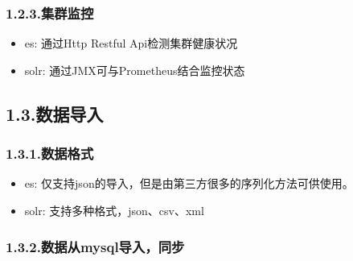\documentclass{article}
\begin{document}
\subsubsection{1.2.3.\hspace*{0.5em}集群监控}\label{section}%

\begin{itemize}[noitemsep,topsep=\mdcompacttopsep]%

\item{}es: 通过Http Restful Api检测集群健康状况%

\item{}solr: 通过JMX可与Prometheus结合监控状态%
\end{itemize}%

\subsection{1.3.\hspace*{0.5em}数据导入}\label{section}%

\subsubsection{1.3.1.\hspace*{0.5em}数据格式}\label{section}%

\begin{itemize}[noitemsep,topsep=\mdcompacttopsep]%

\item{}es: 仅支持json的导入，但是由第三方很多的序列化方法可供使用。%

\item{}solr: 支持多种格式，json、csv、xml%
\end{itemize}%

\subsubsection{1.3.2.\hspace*{0.5em}数据从mysql导入，同步}\label{sec-mysql}%
\end{document}
